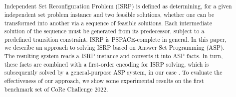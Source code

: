\usepackage{color}

\title{
}


\author{%
\and
{}
\and
{}
\and
{}
\and
{}
}



\begin{abstract}
Independent Set Reconfiguration Problem (ISRP) is defined as determining,
for a given independent set problem instance and two feasible solutions,
whether one can be transformed into another via a sequence of feasible
solutions. Each intermediate solution of the sequence must be
generated from its predecessor, subject to a predefined transition
constraint. ISRP is PSPACE-complete in general.
%
In this paper, we describe an approach to solving ISRP
based on Answer Set Programming (ASP).
The resulting system reads a ISRP instance and converts it into ASP facts.
In turn, these facts are combined with a first-order encoding for ISRP
solving, which is subsequently solved by a general-purpose ASP system,
in our case {\clingo}.
To evaluate the effectiveness of our approach,
we show some experimental results on the first
benchmark set of CoRe Challenge 2022.
\end{abstract}

\def\Style{``jsaiac.sty''}
\def\BibTeX{{\rm B\kern-.05em{\sc i\kern-.025em b}\kern-.08em%
 T\kern-.1667em\lower.7ex\hbox{E}\kern-.125emX}}
\def\JBibTeX{\leavevmode\lower .6ex\hbox{J}\kern-0.15em\BibTeX}
\def\LaTeXe{\LaTeX\kern.15em2$_{\textstyle\varepsilon}$}


\maketitle



